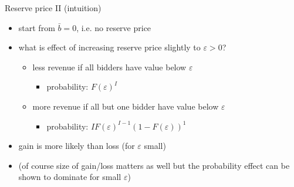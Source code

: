 \documentclass[bigger]{beamer}
\begin{document}
\begin{frame}[label={sec:org0ff1e36}]{Reserve price II (intuition)}
\begin{itemize}
\item start from \(\bar b=0\), i.e. no reserve price
\item what is effect of increasing reserve price slightly to \(\varepsilon>0\)?
\begin{itemize}
\item less revenue if all bidders have value below \(\varepsilon\)
\begin{itemize}
\item probability: \(F(\varepsilon)^I\)
\end{itemize}
\item more revenue if all but one bidder have value below \(\varepsilon\)
\begin{itemize}
\item probability: \(I F(\varepsilon)^{I-1} (1-F(\varepsilon))^1\)
\end{itemize}
\end{itemize}
\item gain is more likely than loss (for \(\varepsilon\) small)
\item (of course size of gain/loss matters as well but the probability effect can be shown to dominate for small \(\varepsilon\))
\end{itemize}
\end{frame}
\end{document}
